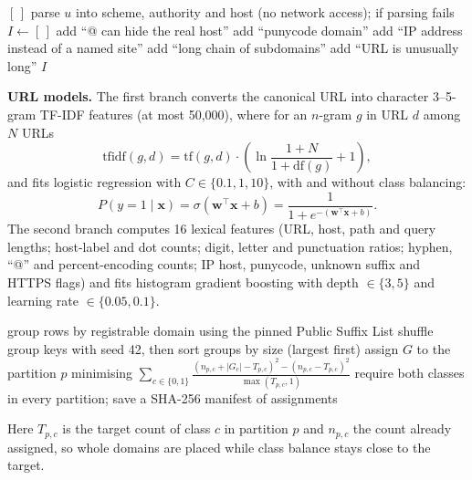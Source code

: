 \begin{algorithm}[!htbp]
\caption{UrlIndicators($u$)}\label{alg:url}
\begin{algorithmic}[1]
 \Return $[\,]$ \EndIf
\State parse $u$ into scheme, authority and host (no network access); if parsing fails 
  \EndIf
\State $I \gets [\,]$
 add ``@ can hide the real host'' \EndIf
{} add ``punycode domain'' \EndIf
{} add ``IP address instead of a named site'' \EndIf
{} add ``long chain of subdomains'' \EndIf
{} add ``URL is unusually long'' \EndIf
\State \Return $I$
\end{algorithmic}
\end{algorithm}


\noindent\textbf{URL models.} The first branch converts the canonical URL into character 3--5-gram TF-IDF features (at most 50,000), where for an $n$-gram $g$ in URL $d$ among $N$ URLs
\begin{equation}
\mathrm{tfidf}(g,d) = \mathrm{tf}(g,d)\cdot\left(\ln\frac{1+N}{1+\mathrm{df}(g)}+1\right),
\end{equation}
and fits logistic regression with $C\in\{0.1,1,10\}$, with and without class balancing:
\begin{equation}
P(y=1\mid \mathbf{x}) = \sigma(\mathbf{w}^\top\mathbf{x}+b) = \frac{1}{1+e^{-(\mathbf{w}^\top\mathbf{x}+b)}}.
\end{equation}
The second branch computes 16 lexical features (URL, host, path and query lengths; host-label and dot counts; digit, letter and punctuation ratios; hyphen, ``@'' and percent-encoding counts; IP host, punycode, unknown suffix and HTTPS flags) and fits histogram gradient boosting with depth $\in\{3,5\}$ and learning rate $\in\{0.05,0.1\}$.

\begin{algorithm}[!htbp]
\caption{Grouped split allocation (seed 42, target 70/10/10/10)}\label{alg:split}
\begin{algorithmic}[1]
\State group rows by registrable domain using the pinned Public Suffix List
\State shuffle group keys with seed 42, then sort groups by size (largest first)
  \State assign $G$ to the partition $p$ minimising $\sum_{c\in\{0,1\}} \frac{(n_{p,c}+|G_c|-T_{p,c})^2-(n_{p,c}-T_{p,c})^2}{\max(T_{p,c},1)}$
\EndFor
\State require both classes in every partition; save a SHA-256 manifest of assignments
\end{algorithmic}
\end{algorithm}
\noindent Here $T_{p,c}$ is the target count of class $c$ in partition $p$ and $n_{p,c}$ the count already assigned, so whole domains are placed while class balance stays close to the target.

